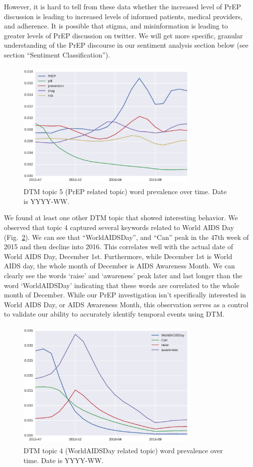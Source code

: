 \documentclass[conference]{IEEEtran}
\begin{document}
However, it is hard to tell from these data whether the increased level of PrEP discussion is leading to increased levels of informed patients, medical providers, and adherence. It is possible that stigma, and misinformation is leading to greater levels of PrEP discussion on twitter. We will get more specific, granular understanding of the PrEP discourse in our sentiment analysis section below (see section ``Sentiment Classification'').

\begin{figure}
\centering
\includegraphics[height=2.5in, width=3.5in]{figs/Fig3}
\caption{DTM topic 5 (PrEP related topic) word prevalence over time. Date is YYYY-WW.}
\label{fig:prep}
\end{figure}

We found at least one other DTM topic that showed interesting behavior. We observed that topic 4 captured several keywords related to World AIDS Day (Fig.~\ref{fig:aids}). We can see that ``WorldAIDSDay'', and ``Can'' peak in the 47th week of 2015 and then decline into 2016. This correlates well with the actual date of World AIDS Day, December 1st. Furthermore, while December 1st is World AIDS day, the whole month of December is AIDS Awareness Month. We can clearly see the words `raise' and `awareness' peak later and last longer than the word `WorldAIDSDay' indicating that these words are correlated to the whole month of December. While our PrEP investigation isn't specifically interested in World AIDS Day, or AIDS Awareness Month, this observation serves as a control to validate our ability to accurately identify temporal events using DTM. 

\begin{figure}
\centering
\includegraphics[height=2.5in, width=3.5in]{figs/Fig4}
\caption{DTM topic 4 (WorldAIDSDay related topic) word prevalence over time. Date is YYYY-WW.}
\label{fig:aids}
\end{figure}
\end{document}
